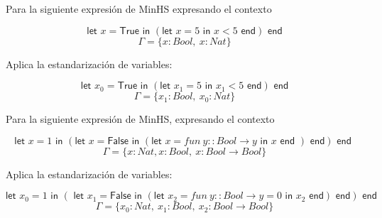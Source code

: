 \begin{exercise}    
    Para la siguiente expresión de \textsf{MinHS} expresando el contexto

    $$ \textsf{let } x = \textsf{True} \textsf{ in } (\textsf{let } x = 5 \textsf{ in } x < 5 \textsf{ end}) \textsf{ end} $$
    $$ \Gamma = \{x:Bool,\ x:Nat\}$$
    
    Aplica la estandarización de variables: 
    
    $$ \textsf{let } x_0 = \textsf{True} \textsf{ in }  (\textsf{let } x_1 = 5 \textsf{ in } x_1 < 5 \textsf{ end}) \textsf{ end} $$
    $$ \Gamma = \{x_1:Bool,\ x_0:Nat\}$$
\end{exercise}

\begin{exercise}    
    Para la siguiente expresión de \textsf{MinHS}, expresando el contexto
    
    $$ \textsf{let } x = 1 \textsf{ in } (\textsf{let } x = \textsf{False} \textsf{ in } (\textsf{let } x = fun\ y :: Bool \to y  \textsf{ in } x \textsf{ end }) \textsf{ end}) \textsf{ end }$$
    $$ \Gamma = \{ x : Nat, x : Bool,\ x : Bool \to Bool \}$$
    
    Aplica la estandarización de variables:
    
    $$ \textsf{let } x_0 = 1 \textsf{ in } (\textsf{ let } x_1 = \textsf{False} \textsf{ in } (\textsf{let } x_2 = fun\ y :: Bool \to y = 0  \textsf{ in } x_2 \textsf{ end}) \textsf{ end}) \textsf{ end} $$
    $$ \Gamma = \{ x_0 : Nat,\ x_1 : Bool,\ x_2 : Bool \to Bool \}$$
\end{exercise}

